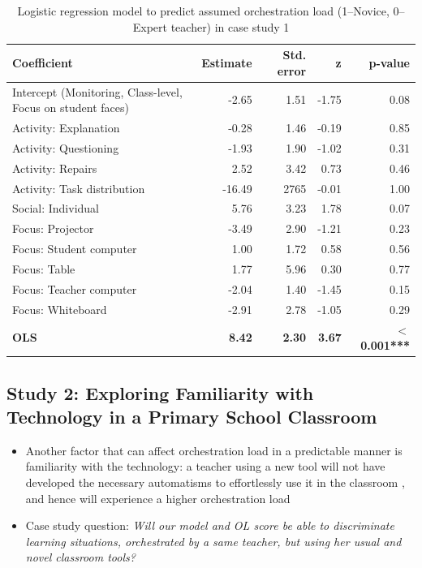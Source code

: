 \documentclass[10pt,journal,compsoc]{IEEEtran}
\begin{document}
\begin{table}[!t]
\caption{Logistic regression model to predict assumed orchestration load (1--Novice, 0--Expert teacher) in case study 1}
\label{tab:case1results}
\centering
\begin{tabular}{|p{2.8cm}||r|r|r|r|}
\hline
Coefficient & Estimate & Std. error & z & p-value\\
\hline
\hline
Intercept (Monitoring, Class-level, Focus on student faces) & -2.65 & 1.51 & -1.75 & 0.08 \\
Activity: Explanation & -0.28 & 1.46 & -0.19 & 0.85 \\
Activity: Questioning & -1.93 & 1.90 & -1.02 & 0.31 \\
Activity: Repairs & 2.52 & 3.42 & 0.73 & 0.46 \\
Activity: Task distribution & -16.49 & 2765 & -0.01 & 1.00 \\
Social: Individual & 5.76 & 3.23 & 1.78 & 0.07 \\
Focus: Projector & -3.49 & 2.90 & -1.21 & 0.23 \\
Focus: Student computer & 1.00 & 1.72 & 0.58 & 0.56 \\
Focus: Table & 1.77 & 5.96 & 0.30 & 0.77 \\
Focus: Teacher computer & -2.04 & 1.40 & -1.45 & 0.15 \\
Focus: Whiteboard & -2.91 & 2.78 & -1.05 & 0.29 \\
\textbf{OLS} & \textbf{8.42} & \textbf{2.30} & \textbf{3.67} & \textbf{$<$0.001***} \\
\hline
\end{tabular}
\end{table}


\subsection{Study 2: Exploring Familiarity with Technology in a Primary School Classroom}

\begin{itemize}
\item Another factor that can affect orchestration load in a predictable manner is familiarity with the technology: a teacher using a new tool will not have developed the necessary automatisms to effortlessly use it in the classroom \cite{feldon2007cognitive}, and hence will experience a higher orchestration load
\item Case study question: \textit{Will our model and OL score be able to discriminate learning situations, orchestrated by a same teacher, but using her usual and novel classroom tools?}
\end{itemize}
\end{document}
